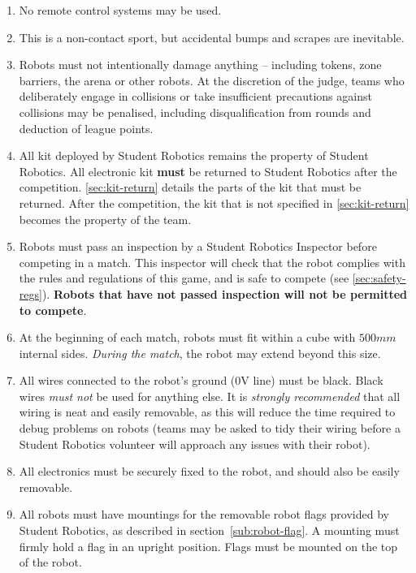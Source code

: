\begin{enumerate}
\item No remote control systems may be used.
\item This is a non-contact sport, but accidental bumps and scrapes are inevitable.
\item Robots must not intentionally damage anything -- including tokens, zone barriers, the arena or other robots.
      At the discretion of the judge, teams who deliberately engage in collisions or take insufficient precautions against collisions may be penalised, including disqualification from rounds and deduction of league points.
\item All kit deployed by Student Robotics remains the property of Student Robotics.
      All electronic kit \textbf{must} be returned to Student Robotics after the competition.
      \autoref{sec:kit-return} details the parts of the kit that must be returned.
      After the competition, the kit that is not specified in \autoref{sec:kit-return} becomes the property of the team.


\item Robots must pass an inspection by a Student Robotics Inspector before competing in a match.
      This inspector will check that the robot complies with the rules and regulations of this game, and is safe to compete (see \autoref{sec:safety-regs}).
      \textbf{Robots that have not passed inspection will not be permitted to compete}.

\item At the beginning of each match, robots must fit within a cube with $500mm$ internal sides.
      \textit{During the match}, the robot may extend beyond this size.

\item All wires connected to the robot's ground (0V line) must be black.
      Black wires \emph{must not} be used for anything else.
      It is \emph{strongly recommended} that all wiring is neat and easily removable, as this will reduce the time required to debug problems on robots
       (teams may be asked to tidy their wiring before a Student Robotics volunteer will approach any issues with their robot).

\item All electronics must be securely fixed to the robot, and should also be easily removable.

\item All robots must have mountings for the removable robot flags
      provided by Student Robotics, as described in section~\ref{sub:robot-flag}. A mounting
      must firmly hold a flag in an upright position. Flags must be mounted on the top of the robot.


\end{enumerate}
